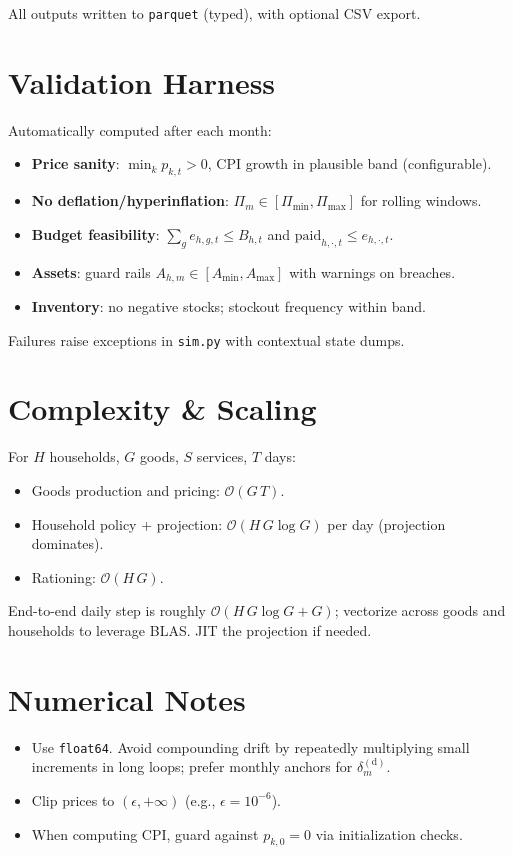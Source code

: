 \documentclass[12pt]{article}
\begin{document}
All outputs written to \texttt{parquet} (typed), with optional CSV export.

\section{Validation Harness}
Automatically computed after each month:
\begin{itemize}
  \item \textbf{Price sanity}: $\min_k p_{k,t}>0$, CPI growth in plausible band (configurable).
  \item \textbf{No deflation/hyperinflation}: $\Pi_m\in[\Pi_{\min},\Pi_{\max}]$ for rolling windows.
  \item \textbf{Budget feasibility}: $\sum_g e_{h,g,t}\le B_{h,t}$ and $\text{paid}_{h,\cdot,t}\le e_{h,\cdot,t}$.
  \item \textbf{Assets}: guard rails $A_{h,m}\in[A_{\min},A_{\max}]$ with warnings on breaches.
  \item \textbf{Inventory}: no negative stocks; stockout frequency within band.
\end{itemize}
Failures raise exceptions in \texttt{sim.py} with contextual state dumps.

\section{Complexity \& Scaling}
For $H$ households, $G$ goods, $S$ services, $T$ days:
\begin{itemize}
  \item Goods production and pricing: $\mathcal{O}(G\,T)$.
  \item Household policy + projection: $\mathcal{O}(H\,G\log G)$ per day (projection dominates).
  \item Rationing: $\mathcal{O}(H\,G)$.
\end{itemize}
End-to-end daily step is roughly $\mathcal{O}(H\,G\log G + G)$; vectorize across goods and households to leverage BLAS. JIT the projection if needed.

\section{Numerical Notes}
\begin{itemize}
  \item Use \texttt{float64}. Avoid compounding drift by repeatedly multiplying small increments in long loops; prefer monthly anchors for $\delta_m^{(\mathrm{d})}$.
  \item Clip prices to $(\epsilon, +\infty)$ (e.g., $\epsilon=10^{-6}$).
  \item When computing CPI, guard against $p_{k,0}=0$ via initialization checks.
\end{itemize}
\end{document}
